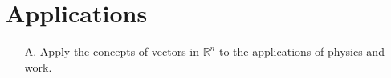 \newpage
\section{Applications}

\begin{outcome}
\begin{enumerate}
\item[A.] Apply the concepts of vectors in $\mathbb{R}^n$ to the applications of physics and work.
\end{enumerate}
\end{outcome}
